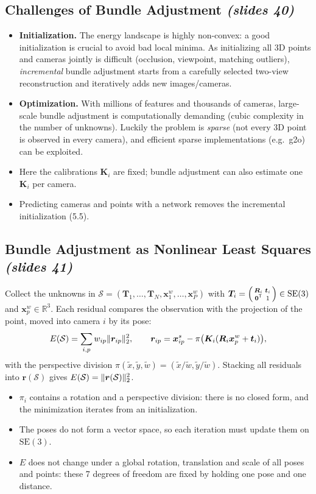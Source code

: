 \documentclass[11pt,a4paper]{article}
\newcommand{\slr}[1]{\texorpdfstring{\emph{(slides #1)}}{(slides #1)}}
\newcommand{\R}{\mathbb{R}}
\newcommand{\SE}{\mathrm{SE}(3)}
\newcommand{\tr}{^{\mathsf T}}
\theoremstyle{definition}
\theoremstyle{plain}
\theoremstyle{remark}
\begin{document}
\subsection{Challenges of Bundle Adjustment \slr{40}}
\begin{itemize}
\item \textbf{Initialization.} The energy landscape is highly non-convex: a good initialization is crucial to avoid bad local minima. As initializing all 3D points and cameras jointly is difficult (occlusion, viewpoint, matching outliers), \emph{incremental} bundle adjustment starts from a carefully selected two-view reconstruction and iteratively adds new images/cameras.
\item \textbf{Optimization.} With millions of features and thousands of cameras, large-scale bundle adjustment is computationally demanding (cubic complexity in the number of unknowns). Luckily the problem is \emph{sparse} (not every 3D point is observed in every camera), and efficient sparse implementations (e.g.\ g2o) can be exploited.
\item Here the calibrations $\bm K_i$ are fixed; bundle adjustment can also estimate one $\bm K_i$ per camera.
\item Predicting cameras and points with a network removes the incremental initialization (5.5).
\end{itemize}

\subsection{Bundle Adjustment as Nonlinear Least Squares \slr{41}}
Collect the unknowns in $\mathcal S=(\bm T_1,\dots,\bm T_N,\bm x^w_1,\dots,\bm x^w_P)$ with $\bm T_i=\begin{psmallmatrix}\bm R_i&\bm t_i\\\bm 0\tr&1\end{psmallmatrix}\in\SE$ and $\bm x^w_p\in\R^3$. Each residual compares the observation with the projection of the point, moved into camera $i$ by its pose:
\[
E(\mathcal S)=\sum_{i,p}w_{ip}\lVert \bm r_{ip}\rVert_2^2,\qquad \bm r_{ip}=\bm x^s_{ip}-\pi\bigl(\bm K_i(\bm R_i\bm x^w_p+\bm t_i)\bigr),
\]
with the perspective division $\pi(\tilde x,\tilde y,\tilde w)=(\tilde x/\tilde w,\tilde y/\tilde w)$. Stacking all residuals into $\bm r(\mathcal S)$ gives $E(\mathcal S)=\lVert \bm r(\mathcal S)\rVert_2^2$.
\begin{itemize}
\item $\pi_i$ contains a rotation and a perspective division: there is no closed form, and the minimization iterates from an initialization.
\item The poses do not form a vector space, so each iteration must update them on $\SE$.
\item $E$ does not change under a global rotation, translation and scale of all poses and points: these 7 degrees of freedom are fixed by holding one pose and one distance.
\end{itemize}
\end{document}
